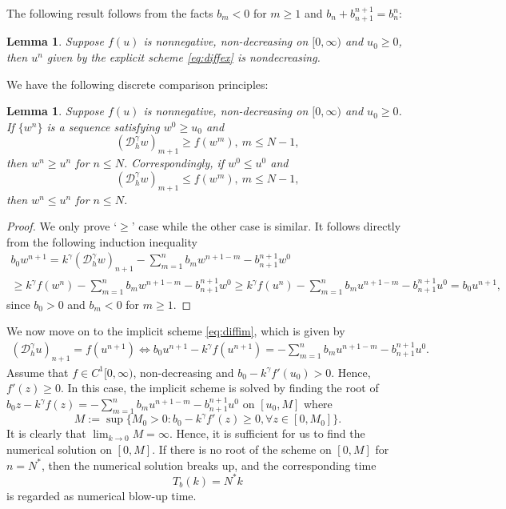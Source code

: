 \documentclass[12pt]{amsart}%
\newtheorem{lmm}[thm]{Lemma}
\theoremstyle{definition}
\theoremstyle{remark}
\renewcommand{\ge}{\geqslant}
\renewcommand{\le}{\leqslant}
\begin{document}
The following result follows from the facts $b_m<0$ for $m\ge 1$ and  $b_n+b_{n+1}^{n+1}=b_n^n$:
\begin{lmm}
Suppose $f(u)$ is nonnegative, non-decreasing on $[0,\infty)$ and $u_0 \ge 0$, then $u^n$ given by the explicit scheme \eqref{eq:diffex} is nondecreasing.
\end{lmm}

We have the following discrete comparison principles:
\begin{lmm}\label{lmm:discretecompex}
Suppose $f(u)$ is nonnegative, non-decreasing on $[0,\infty)$ and $u_0 \ge 0$. If $\{w^n\}$ is a sequence satisfying $w^0\ge u_0$ and \[
(\mathcal{D}_h^{\gamma}w)_{m+1}\ge f(w^m),~ m\le N-1,
\]
then $w^n\ge u^n$ for $n\le N$. Correspondingly, if $w^0\le u^0$ and \[
(\mathcal{D}_h^{\gamma}w)_{m+1}\le f(w^m),~m\le N-1,
\]
then $w^n\le u^n$ for $n\le N$.
\end{lmm}
\begin{proof}
We only prove `$\ge$' case while the other case is similar. It follows directly from the following induction inequality
\begin{multline*}
b_0w^{n+1}=k^{\gamma}(\mathcal{D}_h^{\gamma}w)_{n+1}-\sum_{m=1}^n b_m w^{n+1-m}
-b_{n+1}^{n+1}w^0 \\
\ge k^{\gamma}f(w^n)-\sum_{m=1}^n b_m w^{n+1-m}
-b_{n+1}^{n+1}w^0
\ge k^{\gamma}f(u^n)-\sum_{m=1}^n b_m u^{n+1-m}
-b_{n+1}^{n+1}u^0=b_0u^{n+1},
\end{multline*}
since $b_0>0$ and $b_m<0$ for $m\ge 1$.
\end{proof}


We now move on to the implicit scheme \eqref{eq:diffim}, which is given by
\begin{gather}\label{eq:implicit}
(\mathcal{D}_h^{\gamma}u)_{n+1}=f(u^{n+1})
\Leftrightarrow
b_0u^{n+1}-k^{\gamma}f(u^{n+1})=-\sum_{m=1}^n b_m u^{n+1-m}
-b_{n+1}^{n+1}u^0.
\end{gather}
Assume that $f\in C^1[0,\infty)$, non-decreasing and $b_0-k^{\gamma}f'(u_0)>0$. Hence, $f'(z)\ge 0$.
In this case, the implicit scheme is solved by finding the root of  $b_0z-k^{\gamma}f(z)=-\sum_{m=1}^n b_m u^{n+1-m}
-b_{n+1}^{n+1}u^0$ on $[u_0, M]$ where
\[
M:=\sup\{M_0>0: b_0-k^{\gamma}f'(z)\ge 0, \forall z\in [0, M_0] \}.
\]
It is clearly that $\lim_{k\to 0}M=\infty$. Hence, it is sufficient for us to find the numerical solution on $[0, M]$. If there is no root of the scheme on $[0, M]$ for $n=N^*$, then the numerical solution breaks up, and the corresponding time 
\begin{equation}
T_b(k)=N^*k
\end{equation}
 is regarded as numerical blow-up time.  
\end{document}
